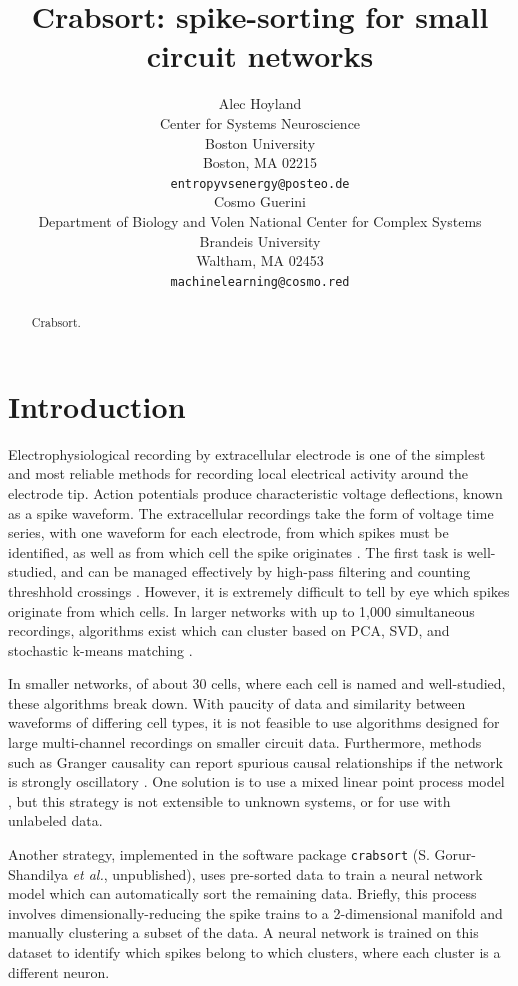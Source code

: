 \documentclass{article}
\title{Crabsort: spike-sorting for small circuit networks}
\author{%
  Alec Hoyland \\
  Center for Systems Neuroscience \\
  Boston University \\
  Boston, MA 02215 \\
  \texttt{entropyvsenergy@posteo.de} \\
  \And
  Cosmo Guerini \\
  Department of Biology and Volen National Center for Complex Systems \\
  Brandeis University \\
  Waltham, MA 02453 \\
  \texttt{machinelearning@cosmo.red}
}
\begin{document}
\maketitle

\begin{abstract}
  Crabsort.
\end{abstract}

\section{Introduction}

Electrophysiological recording by extracellular electrode is one of the simplest and most reliable
methods for recording local electrical activity around the electrode tip.
Action potentials produce characteristic voltage deflections, known as a spike waveform.
The extracellular recordings take the form of voltage time series, with one waveform for each electrode,
from which spikes must be identified, as well as from which cell the spike originates \autocite{quirogaSpikeSorting2012}.
The first task is well-studied, and can be managed effectively by high-pass filtering and counting threshhold crossings \autocite{rossantSpikeSortingLarge2016, quirogaSpikeSorting2012}.
However, it is extremely difficult to tell by eye which spikes originate from which cells.
In larger networks with up to 1,000 simultaneous recordings, algorithms exist which can cluster
based on PCA, SVD, and stochastic k-means matching \autocite{pachitariuKilosortRealtimeSpikesorting2016, rossantSpikeSortingLarge2016}.

In smaller networks, of about 30 cells, where each cell is named and well-studied,
these algorithms break down. With paucity of data and similarity between waveforms of differing cell types,
it is not feasible to use algorithms designed for large multi-channel recordings on smaller circuit data.
Furthermore, methods such as Granger causality can report spurious causal relationships
if the network is strongly oscillatory \autocite{kisperskyFunctionalConnectivityRhythmic2011}.
One solution is to use a mixed linear point process model \autocite{gerhardSuccessfulReconstructionPhysiological2013a},
but this strategy is not extensible to unknown systems, or for use with unlabeled data.

Another strategy, implemented in the software package \texttt{crabsort} (S. Gorur-Shandilya \textit{et al.}, unpublished),
uses pre-sorted data to train a neural network model which can automatically sort the remaining data.
Briefly, this process involves dimensionally-reducing the spike trains to a 2-dimensional manifold
and manually clustering a subset of the data.
A neural network is trained on this dataset to identify which spikes belong to which clusters,
where each cluster is a different neuron.
\end{document}

